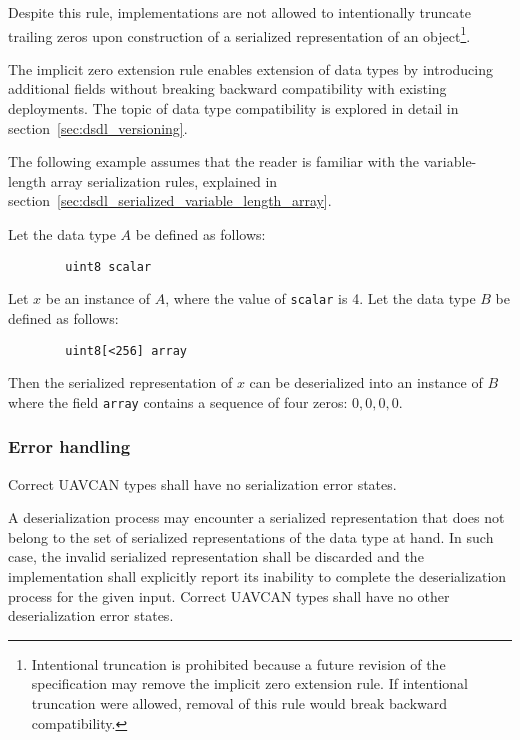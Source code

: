 Despite this rule, implementations are not allowed to intentionally truncate trailing zeros
upon construction of a serialized representation of an object\footnote{%
    Intentional truncation is prohibited because a future revision of the specification may remove the implicit zero
    extension rule.
    If intentional truncation were allowed, removal of this rule would break backward compatibility.
}.

\begin{remark}
    The implicit zero extension rule enables extension of data types by introducing additional fields
    without breaking backward compatibility with existing deployments.
    The topic of data type compatibility is explored in detail in section~\ref{sec:dsdl_versioning}.

    The following example assumes that the reader is familiar with the variable-length array serialization rules,
    explained in section~\ref{sec:dsdl_serialized_variable_length_array}.

    Let the data type $A$ be defined as follows:

    \begin{verbatim}
        uint8 scalar
    \end{verbatim}

    Let $x$ be an instance of $A$, where the value of \verb|scalar| is 4.
    Let the data type $B$ be defined as follows:

    \begin{verbatim}
        uint8[<256] array
    \end{verbatim}

    Then the serialized representation of $x$ can be deserialized into an instance of $B$ where the field
    \verb|array| contains a sequence of four zeros: $0, 0, 0, 0$.
\end{remark}

\subsubsection{Error handling}

Correct UAVCAN types shall have no serialization error states.

A deserialization process may encounter a serialized representation that does not belong to the
set of serialized representations of the data type at hand.
In such case, the invalid serialized representation shall be discarded and the implementation
shall explicitly report its inability to complete the deserialization process for the given input.
Correct UAVCAN types shall have no other deserialization error states.

